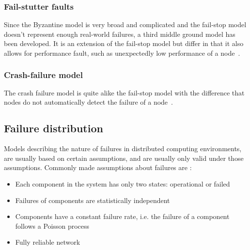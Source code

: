 \documentclass{cslthse-msc}
\begin{document}

\subsubsection{Fail-stutter faults}
Since the Byzantine model is very broad and complicated and the fail-stop model doesn't represent enough real-world failures, a third middle ground model has been developed. It is an extension of the fail-stop model but differ in that it also allows for performance fault, such as unexpectedly low performance of a node~\cite{surveyFaultParallel}.

\subsubsection{Crash-failure model}
The crash failure model is quite alike the fail-stop model with the difference that nodes do not automatically detect the failure of a node~\cite{faultTolerantFundamentals, adaptiveAgentReplication}.

\subsection{Failure distribution} \label{subsec:background_failure_distribution}
Models describing the nature of failures in distributed computing environments, are usually based on certain assumptions, and are usually only valid under those assumptions. Commonly made assumptions about failures are \cite{relModelDistSimSystem, relModelAnalysis, cloudServiceRel, studyServiceRel, hierarchicalRelModeling, selfAdaptRel}:
\begin{itemize}
	\item Each component in the system has only two states: operational or failed
	\item Failures of components are statistically independent
	\item Components have a constant failure rate, i.e. the failure of a component follows a Poisson process
	\item Fully reliable network
\end{itemize}
\end{document}
